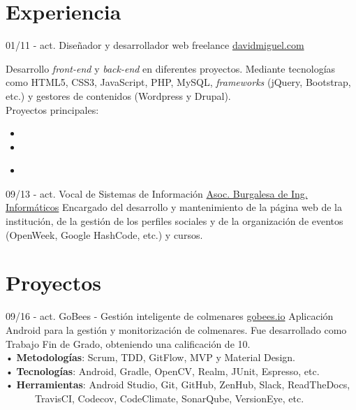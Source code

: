 \documentclass[]{friggeri-cv}
\begin{document}
\section{Experiencia}
\begin{entrylist}
    \entry
    {01/11 - act.}
    {Diseñador y desarrollador web freelance}
    {\href{http://davidmiguel.com/}{davidmiguel.com}}
    {Desarrollo \textit{front-end} y \textit{back-end} en diferentes proyectos. Mediante tecnologías como HTML5, CSS3, JavaScript, PHP, MySQL, \textit{frameworks} (jQuery, Bootstrap, etc.) y gestores de contenidos (Wordpress y Drupal).
    \\ [2mm]
    Proyectos principales:
    \begin{itemize}[noitemsep]
        \item {} 
        \item {}         
        \item {} \\
    \end{itemize}    
    }
    \entry
    {09/13 - act.}
    {Vocal de Sistemas de Información}
    {\href{http://abi2burgos.es/}{Asoc. Burgalesa de Ing. Informáticos}}
    {Encargado del desarrollo y mantenimiento de la página web de la institución, de la gestión de los perfiles sociales y de la organización de eventos (OpenWeek, Google HashCode, etc.) y cursos.\\}
\end{entrylist}

\section{Proyectos}
\begin{entrylist}
  \entry
    {09/16 - act.}
    {GoBees - Gestión inteligente de colmenares}
    {\href{http://gobees.io/}{gobees.io}}
    {Aplicación Android para la gestión y monitorización de colmenares. Fue desarrollado como Trabajo Fin de Grado, obteniendo una calificación de 10.
    \\ [2mm]
    • \textbf{Metodologías}: Scrum, TDD, GitFlow, MVP y Material Design.\\
    • \textbf{Tecnologías}: Android, Gradle, OpenCV, Realm, JUnit,  Espresso, etc.\\
    • \textbf{Herramientas}: Android Studio, Git, GitHub, ZenHub, Slack, ReadTheDocs,\\       TravisCI, Codecov, CodeClimate, SonarQube, VersionEye, etc.\\}
\end{entrylist}
\end{document}
